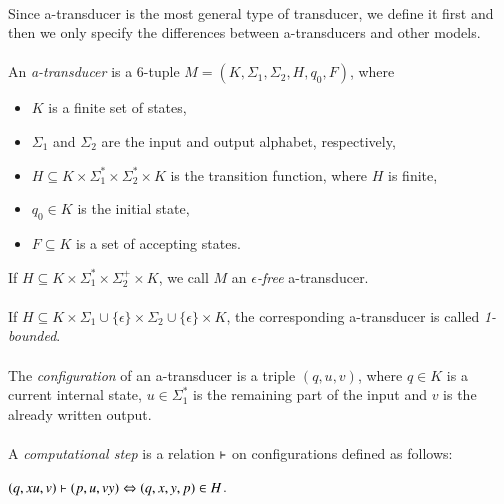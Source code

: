 \paragraph{}
Since a-transducer is the most general type of transducer, we define it first and then we only specify the differences between a-transducers and other models.

\paragraph{}
 An \emph{a-transducer} is a 6-tuple $M=(K, \Sigma_{1}, \Sigma_{2}, H, q_{0}, F)$, where
\begin{itemize}
\item $K$ is a finite set of states,
\item $\Sigma_{1} $ and $\Sigma_{2} $ are the input and output alphabet, respectively,
\item $H \subseteq K \times \Sigma_{1}^{*} \times \Sigma_{2}^{*} \times K$ is the transition function, where $H$ is finite,
\item $q_{0} \in K$ is the initial state,
\item $F \subseteq K$ is a set of accepting states.
\end{itemize}
If $H \subseteq K \times \Sigma_{1}^{*} \times \Sigma_{2}^{+} \times K$, we call $M$ an \emph{$\epsilon $-free} a-transducer.

\paragraph{}
 If $H \subseteq K \times \Sigma_{1} \cup \{ \epsilon \} \times \Sigma_{2} \cup \{ \epsilon \} \times K$, the corresponding a-transducer is called \emph{1-bounded}.

\paragraph{}
 The \emph{configuration} of an a-transducer is a triple $(q, u, v)$, where $q \in K$ is a current internal state, $u \in \Sigma_{1}^{*}$ is the remaining part of the input and $v$ is the already written output.

\paragraph{}
 A \emph{computational step} is a relation $\vdash$ on configurations defined as follows: \\
\centerline{$(q, xu, v) \vdash (p, u, vy) \Leftrightarrow (q, x, y, p) \in H$.}

